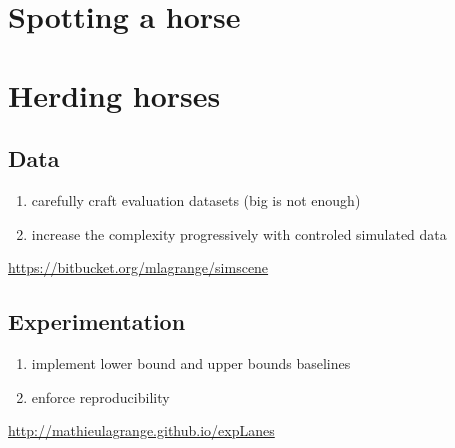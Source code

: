 \documentclass[a4paper,fleqn]{tufte-handout}
\begin{document}
\section{Spotting a horse}

\cite{aucouturier2007bag}

\cite{lagrange:hal-01082501}

\section{Herding horses}



\subsection{Data}

\begin{enumerate}
\item carefully craft evaluation datasets (big is not enough)
\item increase the complexity progressively with controled simulated data
\end{enumerate}

\url{https://bitbucket.org/mlagrange/simscene}

\subsection{Experimentation}

\begin{enumerate}
\item implement lower bound and upper bounds baselines
\item enforce reproducibility
\end{enumerate}

\url{http://mathieulagrange.github.io/expLanes}


  
 
 
  
\end{document}

